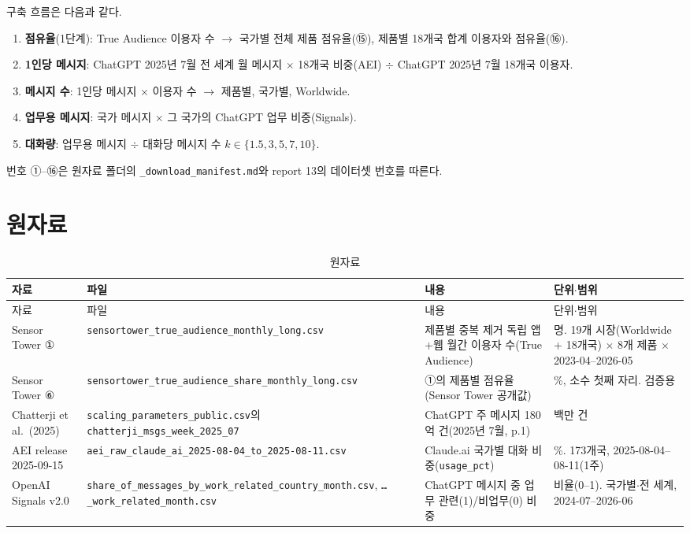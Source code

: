 \documentclass[11pt]{article}
\begin{document}
구축 흐름은 다음과 같다.
\begin{enumerate}[leftmargin=*]
  \item \textbf{점유율}(1단계): True Audience 이용자 수 $\to$ 국가별 전체 제품 점유율(⑮), 제품별 18개국 합계 이용자와 점유율(⑯).
  \item \textbf{1인당 메시지}: ChatGPT 2025년 7월 전 세계 월 메시지 $\times$ 18개국 비중(AEI) $\div$ ChatGPT 2025년 7월 18개국 이용자.
  \item \textbf{메시지 수}: 1인당 메시지 $\times$ 이용자 수 $\to$ 제품별, 국가별, Worldwide.
  \item \textbf{업무용 메시지}: 국가 메시지 $\times$ 그 국가의 ChatGPT 업무 비중(Signals).
  \item \textbf{대화량}: 업무용 메시지 $\div$ 대화당 메시지 수 $k \in \{1.5, 3, 5, 7, 10\}$.
\end{enumerate}
번호 ①--⑯은 원자료 폴더의 \texttt{\_download\_manifest.md}와 report 13의 데이터셋 번호를 따른다.

\section{원자료}

\begin{longtable}{L{2.6cm}L{4.6cm}L{4.4cm}L{4.2cm}}
\caption{원자료}\label{tab:raw}\\
\toprule
자료 & 파일 & 내용 & 단위$\cdot$범위 \\
\midrule
\endfirsthead
\toprule
자료 & 파일 & 내용 & 단위$\cdot$범위 \\
\midrule
\endhead
Sensor Tower ① & \texttt{sensortower\_true\_audience\_monthly\_long.csv} & 제품별 중복 제거 독립 앱+웹 월간 이용자 수(True Audience) & 명. 19개 시장(Worldwide + 18개국) $\times$ 8개 제품 $\times$ 2023-04--2026-05 \\
Sensor Tower ⑥ & \texttt{sensortower\_true\_audience\_share\_monthly\_long.csv} & ①의 제품별 점유율(Sensor Tower 공개값) & \%, 소수 첫째 자리. 검증용 \\
Chatterji et al.\ (2025) & \texttt{scaling\_parameters\_public.csv}의 \texttt{chatterji\_msgs\_week\_2025\_07} & ChatGPT 주 메시지 180억 건(2025년 7월, p.1) & 백만 건 \\
AEI release 2025-09-15 & \texttt{aei\_raw\_claude\_ai\_2025-08-04\_to\_2025-08-11.csv} & Claude.ai 국가별 대화 비중(\texttt{usage\_pct}) & \%. 173개국, 2025-08-04--08-11(1주) \\
OpenAI Signals v2.0 & \texttt{share\_of\_messages\_by\_work\_related\_country\_month.csv}, \texttt{\ldots\_work\_related\_month.csv} & ChatGPT 메시지 중 업무 관련(1)/비업무(0) 비중 & 비율(0--1). 국가별$\cdot$전 세계, 2024-07--2026-06 \\
\bottomrule
\end{longtable}
\end{document}
